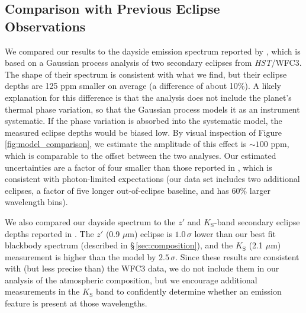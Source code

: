 \documentclass[twocolumn, trackchanges]{aastex61}
\newcommand{\project}[1]{\textsl{#1}}
\newcommand{\HST}{\project{HST}}
\begin{document}
\subsection{Comparison with Previous Eclipse Observations}
We compared our results to the dayside emission spectrum reported by \cite{cartier17}, which is based on a Gaussian process analysis of two secondary eclipses from \HST/WFC3. The shape of their spectrum is consistent with what we find, but their eclipse depths are 125 ppm smaller on average (a difference of about 10\%). A likely explanation for this difference is that the \cite{cartier17} analysis does not include the planet's thermal phase variation, so that the Gaussian process models it as an instrument systematic.  If the phase variation is absorbed into the systematic model, the measured eclipse depths would be biased low.  By visual inspection of Figure\,\ref{fig:model_comparison}, we estimate the amplitude of this effect is $\sim100$ ppm, which is comparable to the offset between the two analyses. Our estimated uncertainties are a factor of four smaller than those reported in \cite{cartier17}, which is consistent with photon-limited expectations (our data set includes two additional eclipses, a factor of five longer out-of-eclipse baseline, and has 60\% larger wavelength bins).


We also compared our dayside spectrum to the $z'$ and $K_\mathrm{S}$-band secondary eclipse depths reported in \cite{delrez18}. The $z'$ (0.9 $\mu$m) eclipse is $1.0\,\sigma$ lower than our best fit blackbody spectrum (described in \S\,\ref{sec:composition}), and the $K_\mathrm{S}$ (2.1 $\mu$m) measurement is higher than the model by $2.5\,\sigma$. Since these results are consistent with (but less precise than) the WFC3 data, we do not include them in our analysis of the atmospheric composition, but we encourage additional measurements in the $K_\mathrm{S}$ band to confidently determine whether an emission feature is present at those wavelengths.
\end{document}
